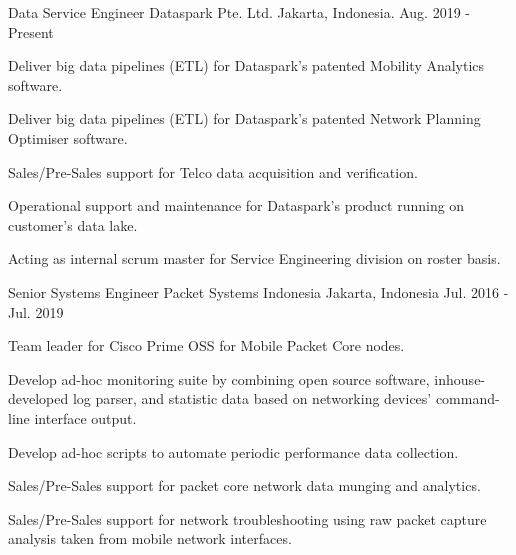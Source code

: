 

\begin{cventries}

\cventry
{Data Service Engineer} %
{Dataspark Pte. Ltd.} %
{Jakarta, Indonesia.} %
{Aug. 2019 - Present} %
{
  \begin{cvitems} %
    \item {Deliver big data pipelines (ETL) for Dataspark's patented Mobility Analytics software.}
    \item {Deliver big data pipelines (ETL) for Dataspark's patented Network Planning Optimiser software.}
    \item {Sales/Pre-Sales support for Telco data acquisition and verification.}
    \item {Operational support and maintenance for Dataspark's product running on customer's data lake.}
    \item {Acting as internal scrum master for Service Engineering division on roster basis.}
  \end{cvitems}
}

  \cventry
    {Senior Systems Engineer} %
    {Packet Systems Indonesia} %
    {Jakarta, Indonesia} %
    {Jul. 2016 - Jul. 2019} %
    {
      \begin{cvitems} %
        \item {Team leader for Cisco Prime OSS for Mobile Packet Core nodes.}
        \item {Develop ad-hoc monitoring suite by combining open source software, inhouse-developed log parser, and statistic data based on networking devices' command-line interface output.}
        \item {Develop ad-hoc scripts to automate periodic performance data collection.}
        \item {Sales/Pre-Sales support for packet core network data munging and analytics.}
        \item {Sales/Pre-Sales support for network troubleshooting using raw packet capture analysis taken from mobile network interfaces.}
      \end{cvitems}
    }


\end{cventries}
